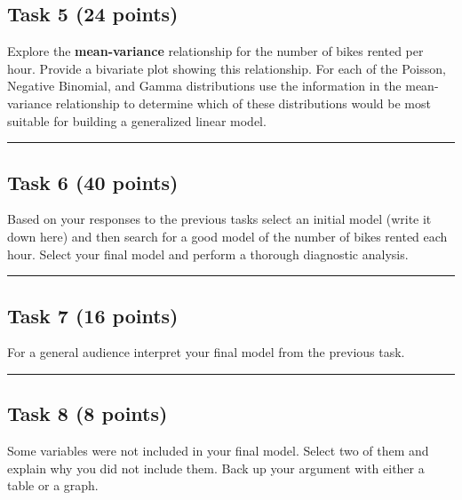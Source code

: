 \documentclass[
]{article}
\begin{document}
\hypertarget{task-5-24-points}{%
\subsection{Task 5 (24 points)}\label{task-5-24-points}}

Explore the \textbf{mean-variance} relationship for the number of bikes
rented per hour. Provide a bivariate plot showing this relationship. For
each of the Poisson, Negative Binomial, and Gamma distributions use the
information in the mean-variance relationship to determine which of
these distributions would be most suitable for building a generalized
linear model.

\begin{center}\rule{0.5\linewidth}{0.5pt}\end{center}

\hypertarget{task-6-40-points}{%
\subsection{Task 6 (40 points)}\label{task-6-40-points}}

Based on your responses to the previous tasks select an initial model
(write it down here) and then search for a good model of the number of
bikes rented each hour. Select your final model and perform a thorough
diagnostic analysis.

\begin{center}\rule{0.5\linewidth}{0.5pt}\end{center}

\hypertarget{task-7-16-points}{%
\subsection{Task 7 (16 points)}\label{task-7-16-points}}

For a general audience interpret your final model from the previous
task.

\begin{center}\rule{0.5\linewidth}{0.5pt}\end{center}

\hypertarget{task-8-8-points}{%
\subsection{Task 8 (8 points)}\label{task-8-8-points}}

Some variables were not included in your final model. Select two of them
and explain why you did not include them. Back up your argument with
either a table or a graph.
\end{document}
